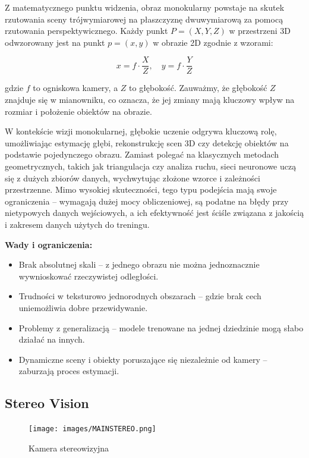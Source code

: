 \documentclass[magisterska]{pracadypl}
\begin{document}
Z matematycznego punktu widzenia, obraz monokularny powstaje na skutek rzutowania sceny trójwymiarowej na płaszczyznę dwuwymiarową za pomocą rzutowania perspektywicznego. Każdy punkt $P = (X,Y,Z)$ w przestrzeni 3D odwzorowany jest na punkt $p = (x,y)$ w obrazie 2D zgodnie z wzorami:

\[
x = f \cdot \frac{X}{Z}, \quad
y = f \cdot \frac{Y}{Z}
\]

gdzie $f$ to ogniskowa kamery, a $Z$ to głębokość. Zauważmy, że głębokość $Z$ znajduje się w mianowniku, co oznacza, że jej zmiany mają kluczowy wpływ na rozmiar i położenie obiektów na obrazie.

W kontekście wizji monokularnej, głębokie uczenie odgrywa kluczową rolę, umożliwiając estymację głębi, rekonstrukcję scen 3D czy detekcję obiektów na podstawie pojedynczego obrazu. Zamiast polegać na klasycznych metodach geometrycznych, takich jak triangulacja czy analiza ruchu, sieci neuronowe uczą się z dużych zbiorów danych, wychwytując złożone wzorce i zależności przestrzenne. Mimo wysokiej skuteczności, tego typu podejścia mają swoje ograniczenia – wymagają dużej mocy obliczeniowej, są podatne na błędy przy nietypowych danych wejściowych, a ich efektywność jest ściśle związana z jakością i zakresem danych użytych do treningu.

\begin{minipage}[t]{\textwidth}
\textbf{Wady i ograniczenia:}
\begin{itemize}
  \item Brak absolutnej skali – z jednego obrazu nie można jednoznacznie wywnioskować rzeczywistej odległości.

  \item Trudności w teksturowo jednorodnych obszarach – gdzie brak cech uniemożliwia dobre przewidywanie.

  \item Problemy z generalizacją – modele trenowane na jednej dziedzinie mogą słabo działać na innych.

  \item Dynamiczne sceny i obiekty poruszające się niezależnie od kamery – zaburzają proces estymacji.
\end{itemize}
\end{minipage}

\subsection{Stereo Vision}

\begin{figure}[H]  %
    \centering  %
    \texttt{[image: images/MAINSTEREO.png]}  %
    \captionsetup{font=footnotesize}
    \caption[Kamera stereowizyjna. https://cell-kom.com/inne/21454-kamera-internetowa-full-hd-b16-1080p-5900217390350.html]{Kamera stereowizyjna}
    \label{fig:mono}  %
\end{figure}
\end{document}
